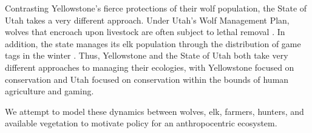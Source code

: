 \documentclass[11pt]{amsart}
\begin{document}
Contrasting Yellowstone's fierce protections of their wolf population, the State of Utah takes a very different approach. Under Utah's Wolf Management Plan, wolves that encroach upon livestock are often subject to lethal removal \cite{utah_wolves}. In addition, the state manages its elk population through the distribution of game tags in the winter \cite{utah_drawings}. Thus, Yellowstone and the State of Utah both take very different approaches to managing their ecologies, with Yellowstone focused on conservation and Utah focused on conservation within the bounds of human agriculture and gaming.

We attempt to model these dynamics between wolves, elk, farmers, hunters, and available vegetation to motivate policy for an anthropocentric ecosystem.




\end{document}
